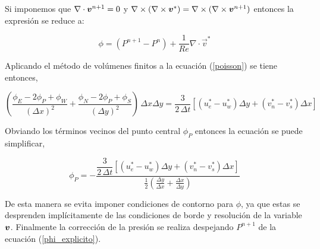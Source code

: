 Si imponemos que $\nabla \cdot \boldsymbol{v}^{n+1} = 0$ y $\nabla \times (\nabla \times \boldsymbol{v}^{*}) = \nabla \times (\nabla \times \boldsymbol{v}^{n+1})$ entonces la expresión se reduce a:

\begin{equation} \label{phi_explicito}
\phi = \left( P^{n+1} - P^n \right) + \dfrac{1}{Re} \nabla \cdot \vec{v}^* 
\end{equation}

Aplicando el método de volúmenes finitos a la ecuación (\ref{poisson}) se tiene entonces,

\begin{equation}
\left( \dfrac{\phi_E-2\phi_P+\phi_W}{(\Delta x)^2} + \dfrac{\phi_N-2\phi_P+\phi_S}{(\Delta y)^2} \right) \, \Delta x \Delta y = \dfrac{3}{2 \, \Delta t} \left[ ( u^*_e - u^*_w ) \Delta y + ( v^*_n - v^*_s ) \Delta x \right]
\end{equation} 

Obviando los términos vecinos del punto central $\phi_P$ entonces la ecuación se puede simplificar,

\begin{equation}
\phi_P = - \frac{\dfrac{3}{2 \, \Delta t} \left[ ( u^*_e - u^*_w ) \Delta y + ( v^*_n - v^*_s ) \Delta x \right]}{ \frac{1}{2} ( \frac{\Delta y}{\Delta x} + \frac{\Delta x}{\Delta y} ) }
\end{equation}

De esta manera se evita imponer condiciones de contorno para $\phi$, ya que estas se desprenden implícitamente de las condiciones de borde y resolución de la variable $\boldsymbol{v}$. Finalmente la corrección de la presión se realiza despejando $P^{n+1}$ de la ecuación (\ref{phi_explicito}). 

